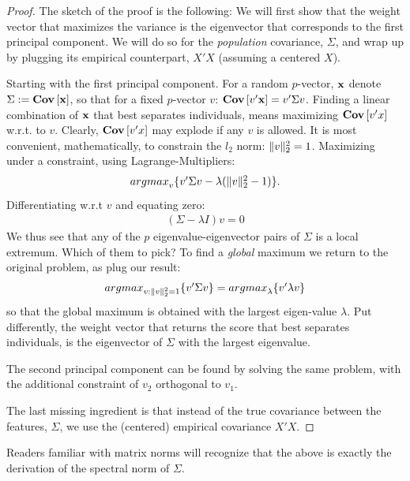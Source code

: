 \documentclass[12pt,a4paper]{article}
\begin{document}
\begin{proof}
	The sketch of the proof is the following:
	We will first show that the weight vector that maximizes the variance is the eigenvector that corresponds to the first principal component.
	We will do so for the \emph{population} covariance, $\Sigma$, and wrap up by plugging its empirical counterpart, $X'X$ (assuming a centered $X$). 
		
	Starting with the first principal component.
	For a random $p$-vector, $\mathbf{x}$ denote $\Sigma:=\mathbf{Cov} \left[ \mathbf{x} \right]$, so that for a fixed $p$-vector $v$: $\mathbf{Cov} \left[ v'\mathbf{x} \right]=v' \Sigma v$.
	Finding a linear combination of $\mathbf{x}$ that best separates individuals, means maximizing $\mathbf{Cov} \left[ v'x \right]$
	w.r.t. to $v$.
	Clearly, $\mathbf{Cov} \left[ v'x \right]$ may explode if any $v$ is allowed. 
	It is most convenient, mathematically, to constrain the $l_2$ norm: $\Vert v \Vert_2^2=1$.
	Maximizing under a constraint, using Lagrange-Multipliers: 
	\begin{align}
	\textstyle{\mathop{argmax}_{v}}\{ v' \Sigma v - \lambda (\Vert v \Vert_2^2-1) \}.
	\end{align}
	Differentiating w.r.t $v$ and equating zero: 
	\begin{align}
	(\Sigma- \lambda I) v = 0
	\end{align}
	We thus see that any of the $p$ eigenvalue-eigenvector pairs of $\Sigma$ is a local extremum. 
	Which of them to pick?
	To find a \emph{global} maximum we return to the original problem, as plug our result:
	\begin{align}
	\label{eq:pca_maximal_variance}
	\textstyle{\mathop{argmax}_{v:\Vert v \Vert_2^2=1}}\{ v' \Sigma v  \}=\textstyle{\mathop{argmax}_{\lambda}}\{ v' \lambda v  \}
	\end{align}
	so that the global maximum is obtained with the largest eigen-value $\lambda$.
	Put differently, the weight vector that returns the score that best separates individuals, is the eigenvector of $\Sigma$ with the largest eigenvalue. 
	
	The second principal component can be found by solving the same problem, with the additional constraint of $v_2$ orthogonal to $v_1$.
	
	The last missing ingredient is that instead of the true covariance between the features, $\Sigma$, we use the (centered) empirical covariance $X'X$.
\end{proof}


\begin{remark}
Readers familiar with matrix norms will recognize that the above is exactly the derivation of the spectral norm of $\Sigma$.
\end{remark}
\end{document}
